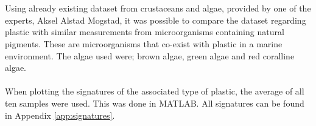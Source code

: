 \\\\
Using already existing dataset from crustaceans and algae, provided by one of the experts, Aksel Alstad Mogstad, it was possible to compare the dataset regarding plastic with similar measurements from microorganisms containing natural pigments. These are microorganisms that co-exist with plastic in a marine environment. The algae used were; brown algae, green algae and red coralline algae.
\\\\
When plotting the signatures of the associated type of plastic, the average of all ten samples were used. This was done in MATLAB. All signatures can be found in Appendix \ref{app:signatures}.




\begin{comment}

\section{Hyperspectral Imaging} 


\subsection{Purpose}
The purpose of the experiment is to get a better understanding of the properties of specific plastic types. By looking at how light is reflected from different types of plastic, it will be possible to compare the plastic types and hopefully detect some kind of pattern. Initially, the plastic pellets will be examined in a dry environment, before being placed in water later on. These results will be compared in order to see if experiments carried out in dry environment can be representative for plastic pellets in wet environment. 

\subsection{Hypotheses}
$\bullet$ Different types of plastic provide different signatures in the visible light spectrum\\ 
$\bullet$ Various types of plastic provide different signatures in infrared light spectrum\\
$\bullet$ Different types of plastic have different intensities of reflecting light\\
$\bullet$ Varying thickness in a specific type of plastic, will give different results\\
$\bullet$ Post consumer recycled pellets and clean pellets have different signatures\\
$\bullet$ The same type of plastic gives a similar signature in water as well as in a dry environment


\end{comment}
